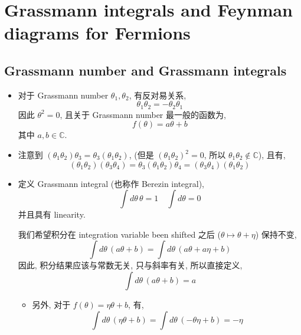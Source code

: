 \chapter{Grassmann integrals and Feynman diagrams for Fermions}
\section{Grassmann number and Grassmann integrals}
\begin{itemize}
	\item 对于 Grassmann number $\theta_1, \theta_2$, 有反对易关系,
	\begin{equation}
		\theta_1 \theta_2 = - \theta_2 \theta_1
	\end{equation}
	因此 $\theta^2 = 0$, 且关于 Grassmann number 最一般的函数为,
	\begin{equation}
		f(\theta) = a \theta + b
	\end{equation}
	其中 $a, b \in \mathbb{C}$.
	
	\item 注意到 $(\theta_1 \theta_2) \theta_3 = \theta_3 (\theta_1 \theta_2)$, (但是 $(\theta_1 \theta_2)^2 = 0$, 所以 $\theta_1 \theta_2 \notin \mathbb{C}$), 且有,
	\begin{equation}
		(\theta_1 \theta_2) (\theta_3 \theta_4) = \theta_3 (\theta_1 \theta_2) \theta_4 = (\theta_3 \theta_4) (\theta_1 \theta_2)
	\end{equation}
	
	\item 定义 Grassmann integral (也称作 Berezin integral),
	\begin{equation}
		\int d\theta \, \theta = 1 \quad \int d\theta = 0
	\end{equation}
	并且具有 linearity.
	
	\begin{tcolorbox}[title=comment:]
		我们希望积分在 integration variable been shifted 之后 ($\theta \mapsto \theta + \eta$) 保持不变,
		\begin{equation}
			\int d\theta \, (a \theta + b) = \int d\theta \, (a \theta + a \eta + b)
		\end{equation}
		因此, 积分结果应该与常数无关, 只与斜率有关, 所以直接定义,
		\begin{equation}
			\int d\theta \, (a \theta + b) = a
		\end{equation}
	\end{tcolorbox}
	
	\begin{itemize}
		\item 另外, 对于 $f(\theta) = \eta \theta + b$, 有,
		\begin{equation}
			\int d\theta \, (\eta \theta + b) = \int d\theta \, (- \theta \eta + b) = - \eta
		\end{equation}
	\end{itemize}
\end{itemize}

